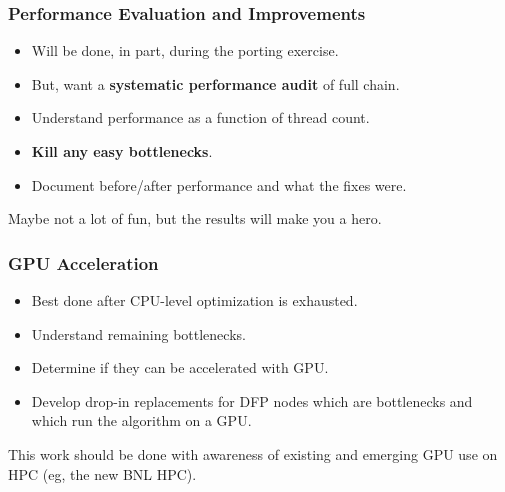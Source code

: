 \documentclass[xcolor=dvipsnames]{beamer}
\begin{document}
\begin{frame}
  \frametitle{Performance Evaluation and Improvements}

  \begin{itemize}
  \item Will be done, in part, during the porting exercise.
  \item But, want a \textbf{systematic performance audit} of full chain.
  \item Understand performance as a function of thread count.
  \item \textbf{Kill any easy bottlenecks}.
  \item Document before/after performance and what the fixes were.
  \end{itemize}

  Maybe not a lot of fun, but the results will make you a hero.

\end{frame}

\begin{frame}
  \frametitle{GPU Acceleration}
  \begin{itemize}
  \item Best done after CPU-level optimization is exhausted.
  \item Understand remaining bottlenecks.
  \item Determine if they can be accelerated with GPU.
  \item Develop drop-in replacements for DFP nodes which are
    bottlenecks and which run the algorithm on a GPU.
  \end{itemize}

  This work should be done with awareness of existing and emerging GPU
  use on HPC (eg, the new BNL HPC).

\end{frame}
\end{document}
